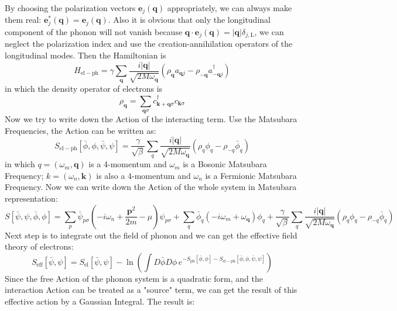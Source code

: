 \documentclass{article}
\newcommand{\mtp}{\mathbf{p}}
\newcommand{\mtq}{\mathbf{q}}
\newcommand{\mtk}{\mathbf{k}}
\begin{document}
By choosing the polarization vectors $\mathbf{e}_j(\mtq)$ appropriately, we can always make them real: $\mathbf{e}^*_j(\mtq) = \mathbf{e}_j(\mtq)$. Also it is obvious that only the longitudinal component of the phonon will not vanish because $\mtq\cdot\mathbf{e}_{j}(\mtq) = |\mtq|\delta_{ j,\mathrm{L}} $, we can neglect the polarization index and use the creation-annihilation operators of the longitudinal modes. Then the Hamiltonian is
\begin{equation}
H_{\mathrm{el-ph}} = \gamma \sum_{\mtq}\frac{i|\mtq|}{\sqrt{2M\omega_{\mtq}}} (\rho_{\mtq}a_{\mtq j}-\rho_{-\mtq} a^\dagger_{-\mtq j}) 
\end{equation}
in which the density operator of electrons is
$$
\rho_{\mtq} = \sum_{\mtq\sigma} c^\dagger_{\mtk+\mtq\sigma}c_{\mtk\sigma}
$$
Now we try to write down the Action of the interacting term. Use the Matsubara Frequencies, the Action can be written as:
\begin{equation}
S_{\mathrm{el-ph}}[\bar{\phi},\phi,\bar{\psi},\psi] = \frac{\gamma}{\sqrt{\beta}} \sum_{q}\frac{i|\mtq|}{\sqrt{2M\omega_\mtq}}(\rho_q\phi_{q} - \rho_{-q}\bar{\phi}_{q}) 
\end{equation}
in which $q = (\omega_m, \mtq)$ is a 4-momentum and $\omega_m$ is a Bosonic Matsubara Frequency; $k = (\omega_n,\mtk)$ is also a 4-momentum and $\omega_n$ is a Fermionic Matsubara Frequency. Now we can write down the Action of the whole system in Matsubara representation:
\begin{equation}
S[\bar{\psi},\psi,\bar{\phi},\phi] = \sum_{p}\bar{\psi}_{p\sigma}\left(-i\omega_n +\frac{\mtp^2}{2m}-\mu\right)\psi_{p\sigma} + \sum_q \bar{\phi}_q(-i\omega_m+\omega_\mtq)\phi_q +\frac{\gamma}{\sqrt{\beta}} \sum_{q}\frac{i|\mtq|}{\sqrt{2M\omega_\mtq}}(\rho_q\phi_{q} - \rho_{-q}\bar{\phi}_{q}) 
\end{equation}
Next step is to integrate out the field of phonon and we can get the effective field theory of electrons:
\begin{equation}
S_{\mathrm{eff}}[\bar{\psi},\psi] = S_{\mathrm{el}}[\bar{\psi},\psi] - \ln{\left(\int D\bar{\phi}D\phi\,e^{-S_{\mathrm{ph}}[\bar{\phi},\phi]-S_{\mathrm{el-ph}}[\bar{\phi},\phi,\bar{\psi},\psi]}\right)}
\end{equation}
Since the free Action of the phonon system is a quadratic form, and the interaction Action can be treated as a "source" term, we can get the result of this effective action by a Gaussian Integral. The result is:
\end{document}
